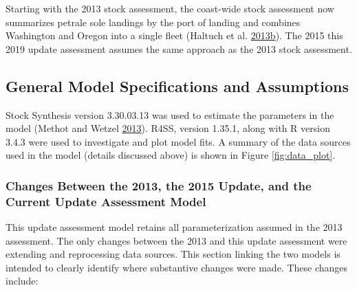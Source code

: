 \documentclass[12pt,]{article}
\begin{document}
Starting with the 2013 stock assessment, the coast-wide stock assessment
now summarizes petrale sole landings by the port of landing and combines
Washington and Oregon into a single fleet (Haltuch et al.
\protect\hyperlink{ref-haltuch_status_2013}{2013}\protect\hyperlink{ref-haltuch_status_2013}{b}).
The 2015 this 2019 update assessment assumes the same approach as the
2013 stock assessment.

\subsection{General Model Specifications and
Assumptions}\label{general-model-specifications-and-assumptions}

Stock Synthesis version 3.30.03.13 was used to estimate the parameters
in the model (Methot and Wetzel
\protect\hyperlink{ref-methot_stock_2013}{2013}). R4SS, version 1.35.1,
along with R version 3.4.3 were used to investigate and plot model fits.
A summary of the data sources used in the model (details discussed
above) is shown in Figure \ref{fig:data_plot}.

\subsubsection{Changes Between the 2013, the 2015 Update, and the
Current Update Assessment
Model}\label{changes-between-the-2013-the-2015-update-and-the-current-update-assessment-model}

This update assessment model retains all parameterization assumed in the
2013 assessment. The only changes between the 2013 and this update
assessment were extending and reprocessing data sources. This section
linking the two models is intended to clearly identify where substantive
changes were made. These changes include:
\end{document}

